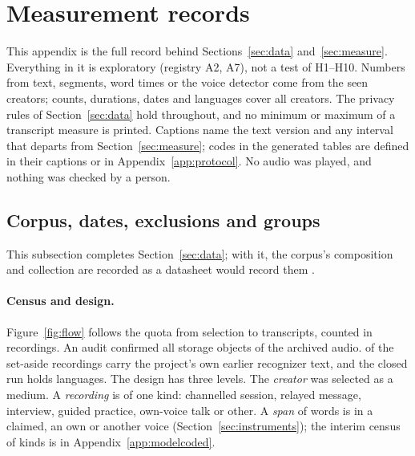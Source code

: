 
\section{Measurement records}
\label{app:measure}

This appendix is the full record behind Sections~\ref{sec:data} and~\ref{sec:measure}. Everything in it is exploratory
(registry A2, A7), not a test of H1--H10. Numbers from text, segments, word times or the voice detector come from the
\NSeen{} seen creators; counts, durations, dates and languages cover all creators. The privacy rules of
Section~\ref{sec:data} hold throughout, and no minimum or maximum of a transcript measure is printed. Captions name the
text version and any interval that departs from Section~\ref{sec:measure}; codes in the generated tables are defined in
their captions or in Appendix~\ref{app:protocol}. No audio was played, and nothing was checked by a person.

\subsection{Corpus, dates, exclusions and groups}
\label{app:corpus}

This subsection completes Section~\ref{sec:data}; with it, the corpus's composition and collection are recorded as a
datasheet would record them \citep{gebru2018datasheets}.

\paragraph{Census and design.} Figure~\ref{fig:flow} follows the quota from selection to transcripts, counted in
recordings. An audit confirmed all \NVerifiedObjects{} storage objects of the archived audio. \NOwnEarlierAsr{} of the
\NSetAside{} set-aside recordings carry the project's own earlier recognizer text, and the closed run holds
\NLanguages{} languages. The design has three levels. The \emph{creator} was selected as a medium. A \emph{recording} is
of one kind: channelled session, relayed message, interview, guided practice, own-voice talk or other. A \emph{span} of
words is in a claimed, an own or another voice (Section~\ref{sec:instruments}); the interim census of kinds is in
Appendix~\ref{app:modelcoded}.

